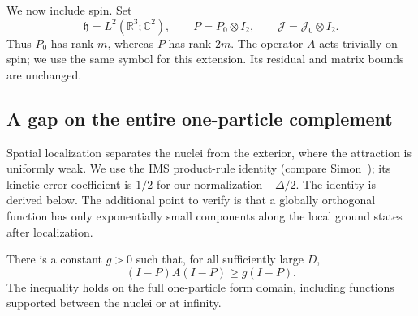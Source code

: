 We now include spin.  Set
\[
 \mathfrak h=L^2(\mathbb R^3;\mathbb C^2),\qquad
 P=P_0\otimes I_2,\qquad
 \mathcal J=\mathcal J_0\otimes I_2.
\]
Thus \(P_0\) has rank \(m\), whereas \(P\) has rank \(2m\).
The operator \(A\) acts trivially on spin; we use the same symbol
for this extension.  Its residual and matrix bounds are unchanged.

\subsection{A gap on the entire one-particle complement}

Spatial localization separates the nuclei from the exterior, where the
attraction is uniformly weak. We use the IMS product-rule identity
(compare Simon~\cite[Lemma~3.1]{Simon1983}); its kinetic-error coefficient
is $1/2$ for our normalization $-\Delta/2$. The identity is derived below.
The additional point to verify is that a globally orthogonal function
has only exponentially small components along the local ground states
after localization.

\begin{proposition}
\label{prop:complement-gap}
There is a constant \(g>0\) such that, for all sufficiently large
\(D\),
\[
 (I-P)A(I-P)\ge g(I-P).
\]
The inequality holds on the full one-particle form domain,
including functions supported between the nuclei or at infinity.
\end{proposition}

